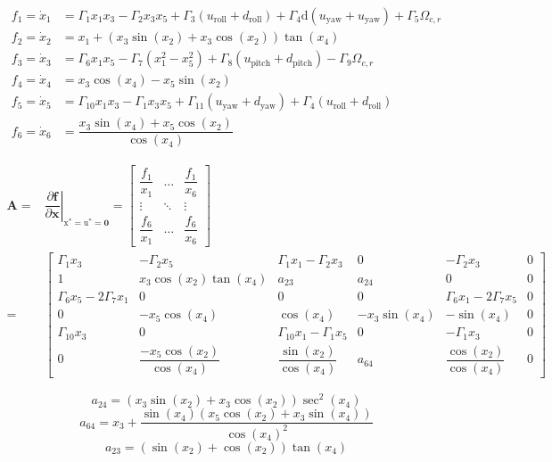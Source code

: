 \documentclass[3p]{elsarticle}
\begin{document}
\begin{align}
    f_1 = \dot{x}_1 &= \Gamma_1 x_1 x_3 - \Gamma_2 x_3 x_5 + \Gamma_3  (u_{\text{roll}} + d_{\text{roll}})
 + \Gamma_4 \mathrm{d} (u_{\text{yaw}} + u_{\text{yaw}}) 
+ \Gamma_5 \Omega_{c, r} \\
    f_2 = \dot{x}_2 &= x_1 + (x_3\sin(x_2) + x_3\cos(x_2))\tan(x_4)  \\
    f_3 = \dot{x}_3 &= \Gamma_6 x_1 x_5 - \Gamma_7 (x_1^2 - x_5^2) + \Gamma_8  (u_{\text{pitch}} + d_{\text{pitch}})- \Gamma_9 \Omega_{c, r} \\
    f_4 = \dot{x}_4 &= x_3\cos(x_4) - x_5\sin(x_2) \\
    f_5 = \dot{x}_5 &= \Gamma_{10} x_1 x_3 - \Gamma_{1} x_3 x_5 + \Gamma_{11} (u_{\text{yaw}} + d_{\text{yaw}}) + \Gamma_{4}(u_{\text{roll}} + d_{\text{roll}})\\
    f_6 = \dot{x}_6 &= \dfrac{x_3\sin(x_4) + x_5\cos(x_2)}{\cos(x_4)}~
\end{align}

\begin{align}
    \mathbf{A} =& \left.\dfrac{\partial \mathbf{f}}{\partial \mathbf{x}}\right|_{\boldsymbol{{\mathrm{x}}}^*= \boldsymbol{{\mathrm{u}}}^*=\boldsymbol{0}} = \begin{bmatrix}
        \dfrac{f_1}{x_1} & \dots & \dfrac{f_1}{x_6} \\
        \vdots & \ddots & \vdots \\
        \dfrac{f_6}{x_1} & \dots & \dfrac{f_6}{x_6}
    \end{bmatrix} \\ =&\begin{bmatrix}
        \Gamma_1 x_3 & -\Gamma_2 x_5 & \Gamma_1 x_1 - \Gamma_2 x_3 & 0 & -\Gamma_2 x_3 & 0 \\
        1 & x_3\cos(x_2)\tan(x_4) & a_{23} & a_{24} & 0 & 0 \\
        \Gamma_6 x_5 - 2\Gamma_7 x_1 & 0 & 0 & 0 & \Gamma_6 x_1 - 2\Gamma_7 x_5 & 0 \\
        0 & -x_5\cos(x_4) & \cos(x_4) & -x_3\sin(x_4) & -\sin(x_4) & 0 \\
        \Gamma_{10} x_3 & 0 & \Gamma_{10} x_1 - \Gamma_1 x_5 & 0 & -\Gamma_1 x_3 & 0 \\
        0 & \dfrac{-x_5\cos(x_2)}{\cos(x_4)} & \dfrac{\sin(x_2)}{\cos(x_4)} & a_{64} & \dfrac{\cos(x_2)}{\cos(x_4)} & 0
    \end{bmatrix}
\end{align}

$$
a_{24} = (x_3\sin(x_2)+x_3\cos(x_2))\sec^2(x_4)
$$
$$
a_{64} = x_3 + \dfrac{\sin(x_4)(x_5\cos(x_2) + x_3\sin(x_4))}{\cos(x_4)^2}
$$
$$
a_{23} = (\sin(x_2)+\cos(x_2))\tan(x_4)
$$
\end{document}
